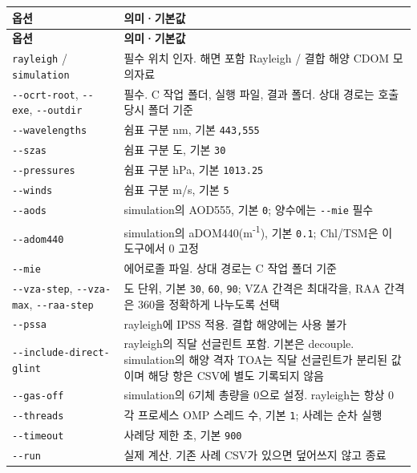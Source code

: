 {\TableFont
\begin{longtable}{@{}>{\raggedright\arraybackslash}p{}>{\raggedright\arraybackslash}p{}@{}}
\toprule
\textbf{옵션} & \textbf{의미·기본값} \\
\midrule
\endfirsthead
\toprule
\textbf{옵션} & \textbf{의미·기본값} \\
\midrule
\endhead
\bottomrule
\endfoot
\texttt{rayleigh} / \texttt{simulation} & 필수 위치 인자. 해면 포함 Rayleigh / 결합 해양 CDOM 모의자료 \\
\texttt{-\allowbreak{}-\allowbreak{}ocrt-\allowbreak{}root}, \texttt{-\allowbreak{}-\allowbreak{}exe}, \texttt{-\allowbreak{}-\allowbreak{}outdir} & 필수. C 작업 폴더, 실행 파일, 결과 폴더. 상대 경로는 호출 당시 폴더 기준 \\
\texttt{-\allowbreak{}-\allowbreak{}wavelengths} & 쉼표 구분 nm, 기본 \texttt{443,\allowbreak{}555} \\
\texttt{-\allowbreak{}-\allowbreak{}szas} & 쉼표 구분 도, 기본 \texttt{30} \\
\texttt{-\allowbreak{}-\allowbreak{}pressures} & 쉼표 구분 hPa, 기본 \texttt{1013.\allowbreak{}25} \\
\texttt{-\allowbreak{}-\allowbreak{}winds} & 쉼표 구분 m/s, 기본 \texttt{5} \\
\texttt{-\allowbreak{}-\allowbreak{}aods} & simulation의 AOD555, 기본 \texttt{0}; 양수에는 \texttt{-\allowbreak{}-\allowbreak{}mie} 필수 \\
\texttt{-\allowbreak{}-\allowbreak{}adom440} & simulation의 aDOM440(m\textsuperscript{-}\textsuperscript{1}), 기본 \texttt{0.\allowbreak{}1}; Chl/TSM은 이 도구에서 0 고정 \\
\texttt{-\allowbreak{}-\allowbreak{}mie} & 에어로졸 파일. 상대 경로는 C 작업 폴더 기준 \\
\texttt{-\allowbreak{}-\allowbreak{}vza-\allowbreak{}step}, \texttt{-\allowbreak{}-\allowbreak{}vza-\allowbreak{}max}, \texttt{-\allowbreak{}-\allowbreak{}raa-\allowbreak{}step} & 도 단위, 기본 \texttt{30}, \texttt{60}, \texttt{90}; VZA 간격은 최대각을, RAA 간격은 360을 정확하게 나누도록 선택 \\
\texttt{-\allowbreak{}-\allowbreak{}pssa} & rayleigh에 IPSS 적용. 결합 해양에는 사용 불가 \\
\texttt{-\allowbreak{}-\allowbreak{}include-\allowbreak{}direct-\allowbreak{}glint} & rayleigh의 직달 선글린트 포함. 기본은 decouple. simulation의 해양 격자 TOA는 직달 선글린트가 분리된 값이며 해당 항은 CSV에 별도 기록되지 않음 \\
\texttt{-\allowbreak{}-\allowbreak{}gas-\allowbreak{}off} & simulation의 6기체 총량을 0으로 설정. rayleigh는 항상 0 \\
\texttt{-\allowbreak{}-\allowbreak{}threads} & 각 프로세스 OMP 스레드 수, 기본 \texttt{1}; 사례는 순차 실행 \\
\texttt{-\allowbreak{}-\allowbreak{}timeout} & 사례당 제한 초, 기본 \texttt{900} \\
\texttt{-\allowbreak{}-\allowbreak{}run} & 실제 계산. 기존 사례 CSV가 있으면 덮어쓰지 않고 종료 \\
\end{longtable}
}

